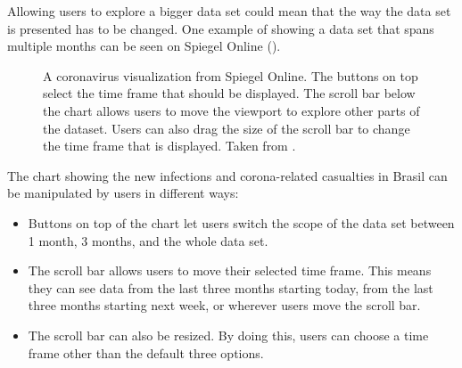 Allowing users to explore a bigger data set could mean that the way the data set is presented has to be changed. One example of showing a data set that spans multiple months can be seen on Spiegel Online (\cite{merlotCoronavirusBrasilienManaus2020}).

\begin{figure}[htb!]
    \caption{A coronavirus visualization from Spiegel Online. The buttons on top select the time frame that should be displayed. The scroll bar below the chart allows users to move the viewport to explore other parts of the dataset. Users can also drag the size of the scroll bar to change the time frame that is displayed. Taken from \cite{merlotCoronavirusBrasilienManaus2020}.}
    \label{fig:spiegel_visualization}
\end{figure}

The chart showing the new infections and corona-related casualties in Brasil can be manipulated by users in different ways:
\begin{itemize}
    \item Buttons on top of the chart let users switch the scope of the data set between 1 month, 3 months, and the whole data set.
    \item The scroll bar allows users to move their selected time frame. This means they can see data from the last three months starting today, from the last three months starting next week, or wherever users move the scroll bar.
    \item The scroll bar can also be resized. By doing this, users can choose a time frame other than the default three options.
\end{itemize}

